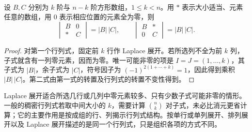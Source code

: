 \begin{proposition}[具有整块零元素的行列式]
\label{prop:determinant-block-triangular}
设 $B,C$ 分别为 $k$ 阶与 $n-k$ 阶方形数组，$1\leq k<n$。用 $*$ 表示大小适当、元素任意的数组，用 $0$ 表示相应位置的元素全为零，则
\begin{equation}
\label{eq:determinant-block-triangular}
    \begin{vmatrix}B&0\\ *&C\end{vmatrix}=|B|\,|C|,
    \qquad
    \begin{vmatrix}B&*\\ 0&C\end{vmatrix}=|B|\,|C|.
\end{equation}
\end{proposition}
\begin{proof}
对第一个行列式，固定前 $k$ 行作 Laplace 展开。若所选列不全为前 $k$ 列，子式就含有一列零元素，因而为零。唯一可能非零的项是 $I=J=(1,\ldots,k)$，其子式为 $|B|$，余子式为 $|C|$，符号因子为 $(-1)^{2(1+\cdots+k)}=1$，因此得到乘积 $|B|\,|C|$。第二式由第一式的转置及行列式的转置不变性得到。
\end{proof}

Laplace 展开适合所选几行或几列中零元素较多、只有少数子式可能非零的情形。一般的稠密行列式若取中间大小的 $k$，需要计算 $\binom{n}{k}$ 对子式，未必比消元更省计算；它的主要作用是按成组的行、列揭示行列式结构。按单行或单列展开、排列展开以及 Laplace 展开描述的是同一个行列式，只是组织各项的方式不同。







